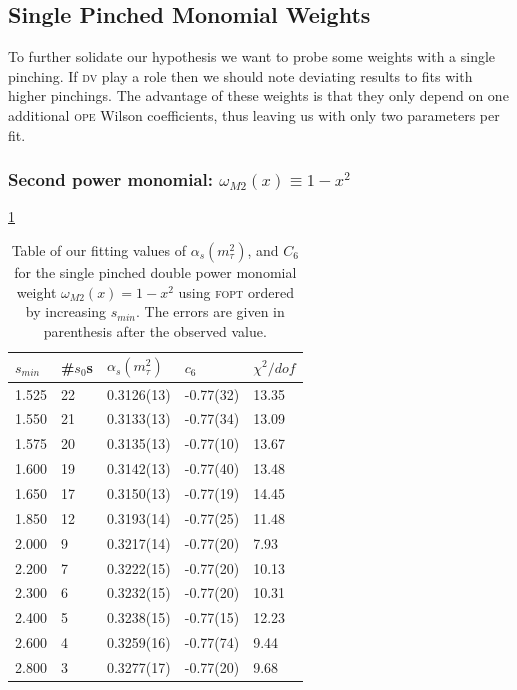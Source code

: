 \documentclass[../../index.tex]{subfiles}
\begin{document}
\subsection{Single Pinched Monomial Weights}
To further solidate our hypothesis we want to probe some weights with a single
pinching. If \textsc{dv} play a role then we should note deviating results to
fits with higher pinchings. The advantage of these weights is that they only
depend on one additional \textsc{ope} Wilson coefficients, thus leaving us with
only two parameters per fit.

\subsubsection{Second power monomial: \(\omega_{M2}(x) \equiv 1-x^2\)}
\cref{table:fitWM2AlD6}
\begin{table}
  \centering
  \begin{tabular}{lllll}
    \toprule
    \(s_{min}\) & \#\(s_0\)s & \(\alpha_s(m_\tau^2)\) & \(c_6\) &  \(\chi^2/dof\)  \\
    \midrule
    1.525 & 22 & 0.3126(13) & -0.77(32) & 13.35 \\
    1.550 & 21 & 0.3133(13) & -0.77(34) & 13.09 \\
    1.575 & 20 & 0.3135(13) & -0.77(10) & 13.67 \\
    1.600 & 19 & 0.3142(13) & -0.77(40) & 13.48 \\
    1.650 & 17 & 0.3150(13) & -0.77(19) & 14.45 \\
    1.850 & 12 & 0.3193(14) & -0.77(25) & 11.48 \\
    2.000 & 9  & 0.3217(14) & -0.77(20) & 7.93 \\
    2.200 & 7  & 0.3222(15) & -0.77(20) & 10.13 \\
    2.300 & 6  & 0.3232(15) & -0.77(20) & 10.31 \\
    2.400 & 5  & 0.3238(15) & -0.77(15) & 12.23 \\
    2.600 & 4  & 0.3259(16) & -0.77(74) & 9.44 \\
    2.800 & 3  & 0.3277(17) & -0.77(20) & 9.68 \\
    \bottomrule
  \end{tabular}
  \caption{Table of our fitting values of \(\alpha_s(m_\tau^2)\), and \(C_{6}\)
    for the single pinched double power monomial weight \(\omega_{M2}(x)=1-x^2\)
    using \textsc{fopt} ordered by increasing \(s_{min}\). The errors are given
    in parenthesis after the observed value.}
  \label{table:fitWM2AlD6}
\end{table}
\end{document}
